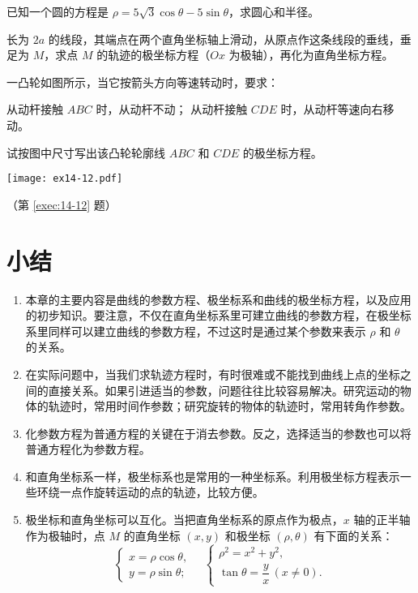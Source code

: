 \begin{Exercise}
\begin{question}
    \item 已知一个圆的方程是 $\rho=5\sqrt{3}\cos\theta-5\sin\theta$，求圆心和半径。
    \item 长为 $2a$ 的线段，其端点在两个直角坐标轴上滑动，从原点作这条线段的垂线，垂足为 $M$，求点 $M$ 的轨迹的极坐标方程（$Ox$ 为极轴），再化为直角坐标方程。
    \item\label{exec:14-12} 一凸轮如图所示，当它按箭头方向等速转动时，要求：
    \begin{tasks}
      \task 从动杆接触 $ABC$ 时，从动杆不动；
      \task 从动杆接触 $CDE$ 时，从动杆等速向右移动。
    \end{tasks}
    试按图中尺寸写出该凸轮轮廓线 $ABC$ 和 $CDE$ 的极坐标方程。
    \begin{figurehere}
      \begin{minipage}{\linewidth}\centering
        \texttt{[image: ex14-12.pdf]}
        \caption*{（第 \ref{exec:14-12} 题）}
      \end{minipage}
    \end{figurehere}
  \end{question}
\end{Exercise}

\section*{小结}
\begin{enumerate}[C、,itemindent=4.5em]
  \item 本章的主要内容是曲线的参数方程、极坐标系和曲线的极坐标方程，以及应用的初步知识。要注意，不仅在直角坐标系里可建立曲线的参数方程，在极坐标系里同样可以建立曲线的参数方程，不过这时是通过某个参数来表示 $\rho$ 和 $\theta$ 的关系。
  \item 在实际问题中，当我们求轨迹方程时，有时很难或不能找到曲线上点的坐标之间的直接关系。如果引进适当的参数，问题往往比较容易解决。研究运动的物体的轨迹时，常用时间作参数；研究旋转的物体的轨迹时，常用转角作参数。
  \item 化参数方程为普通方程的关键在于消去参数。反之，选择适当的参数也可以将普通方程化为参数方程。
  \item 和直角坐标系一样，极坐标系也是常用的一种坐标系。利用极坐标方程表示一些环绕一点作旋转运动的点的轨迹，比较方便。
  \item 极坐标和直角坐标可以互化。当把直角坐标系的原点作为极点，$x$ 轴的正半轴作为极轴时，点 $M$ 的直角坐标 $(x,y)$ 和极坐标 $(\rho,\theta)$ 有下面的关系：
  \[\begin{cases} x=\rho\cos\theta,\\y=\rho\sin\theta; \end{cases} \quad \begin{cases} \rho^2=x^2+y^2,\\\tan\theta=\dfrac{y}{x}\,(x\neq 0). \end{cases} \]
\end{enumerate}
